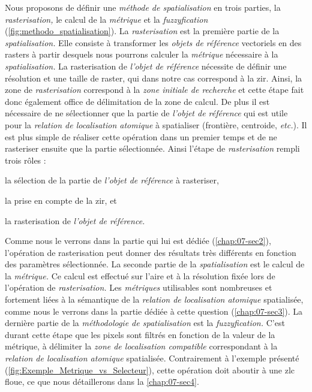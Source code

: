 Nous proposons de définir une \emph{méthode de spatialisation} en
trois parties, la \emph{rasterisation,} le calcul de la
\emph{métrique} et la \emph{fuzzyfication}
(\autoref{fig:methodo_spatialisation}). La \emph{rasterisation} est la
première partie de la \emph{spatialisation.} Elle consiste à
transformer les \emph{objets de référence} vectoriels en des rasters à
partir desquels nous pourrons calculer la \emph{métrique} nécessaire à
la \emph{spatialisation.} La rasterisation de \emph{l'objet de
  référence} nécessite de définir une résolution et une taille de
raster, qui dans notre cas correspond à la \ac{zir}. Ainsi, la zone de
\emph{rasterisation} correspond à la \emph{zone initiale de recherche}
et cette étape fait donc également office de délimitation de la zone
de calcul. De plus il est nécessaire de ne sélectionner que la partie
de \emph{l'objet de référence} qui est utile pour la \emph{relation de
  localisation atomique} à spatialiser (\eg frontière, centroide,
\emph{etc.}). Il est plus simple de réaliser cette opération dans un
premier temps et de ne rasteriser ensuite que la partie
sélectionnée. Ainsi l'étape de \emph{rasterisation} rempli trois rôles
:
%
\begin{enumerate*}[label=(\alph*)]
\item la sélection de la partie de \emph{l'objet de référence} à rasteriser,
\item la prise en compte de la \ac{zir}, et
\item la rasterisation de \emph{l'objet de référence.}  
\end{enumerate*}
%
Comme nous le verrons dans la partie qui lui est dédiée
(\autoref{chap:07-sec2}), l'opération de rasterisation peut donner des
résultats très différents en fonction des paramètres sélectionnée. La
seconde partie de la \emph{spatialisation} est le calcul de la
\emph{métrique.} Ce calcul est effectué sur l'aire et à la résolution
fixée lors de l'opération de \emph{rasterisation.} Les
\emph{métriques} utilisables sont nombreuses et fortement liées à la
sémantique de la \emph{relation de localisation atomique} spatialisée,
comme nous le verrons dans la partie dédiée à cette question
(\autoref{chap:07-sec3}). La dernière partie de la \emph{méthodologie
  de spatialisation} est la \emph{fuzzyfication.} C'est durant cette
étape que les pixels sont filtrés en fonction de la valeur de la
métrique, à délimiter la \emph{zone de localisation compatible}
correspondant à la \emph{relation de localisation atomique}
spatialisée. Contrairement à l'exemple présenté
(\autoref{fig:Exemple_Metrique_vs_Selecteur}), cette opération doit
aboutir à une \ac{zlc} floue, ce que nous détaillerons dans la
\autoref{chap:07-sec4}.


